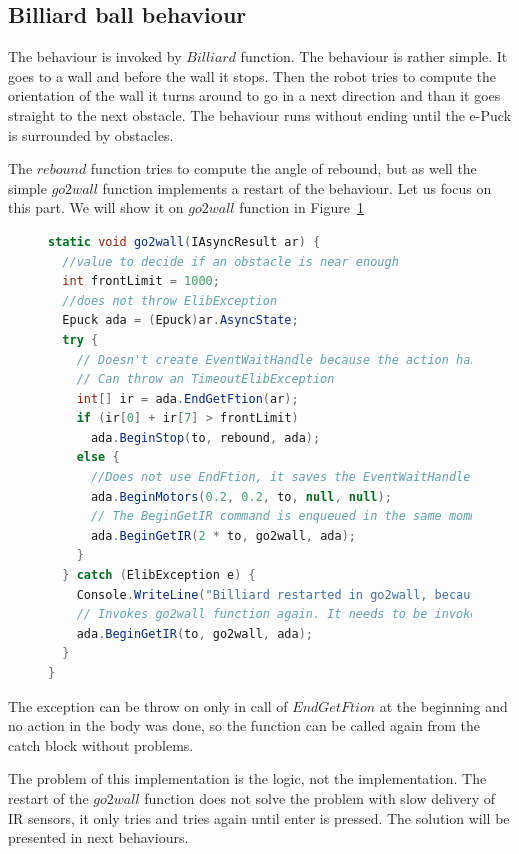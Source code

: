 \subsection{Billiard ball behaviour}\label{ssec:billiard}
  The behaviour is invoked by $Billiard$ function. The behaviour is rather simple.
  It goes to a wall and before the wall it stops. Then the robot tries to compute the
  orientation of the wall it turns around to go in a next direction and than it goes straight
  to the next obstacle.
  The behaviour runs without ending until the e-Puck is surrounded by obstacles.

  The $rebound$ function tries to compute the angle of rebound, but as well the simple $go2wall$ function
  implements a restart of the behaviour.
  Let us focus on this part. We will show it on $go2wall$ function in Figure~\ref{fig:restart}

\begin{figure}[!hbp]
\begin{lstlisting}[language=cs]
static void go2wall(IAsyncResult ar) {
  //value to decide if an obstacle is near enough
  int frontLimit = 1000;  
  //does not throw ElibException
  Epuck ada = (Epuck)ar.AsyncState;
  try {
    // Doesn't create EventWaitHandle because the action has already completed synchronously.
    // Can throw an TimeoutElibException
    int[] ir = ada.EndGetFtion(ar);    
    if (ir[0] + ir[7] > frontLimit)
      ada.BeginStop(to, rebound, ada);
    else {
      //Does not use EndFtion, it saves the EventWaitHandle. We suppose, that it succeeds now or in next rounds.
      ada.BeginMotors(0.2, 0.2, to, null, null);
      // The BeginGetIR command is enqueued in the same momment as BeginMotors, therefore double timeout is used.
      ada.BeginGetIR(2 * to, go2wall, ada);
    }
  } catch (ElibException e) {
    Console.WriteLine("Billiard restarted in go2wall, because of exception:\n" + e.Message);
    // Invokes go2wall function again. It needs to be invoked by BeginGetIR command, because it expects ar with IR values.
    ada.BeginGetIR(to, go2wall, ada);
  }
}
\end{lstlisting}
\caption{\label{fig:restart} } 
\end{figure}

  The exception can be throw on only in call of $EndGetFtion$ at the beginning and 
  no action in the body was done, so the function can be called again from the catch block without problems.

  The problem of this implementation is the logic, not the implementation. 
  The restart of the $go2wall$ function does not solve the problem with 
  slow delivery of IR sensors, it only tries and tries again until enter is pressed.
  The solution will be presented in next behaviours.

